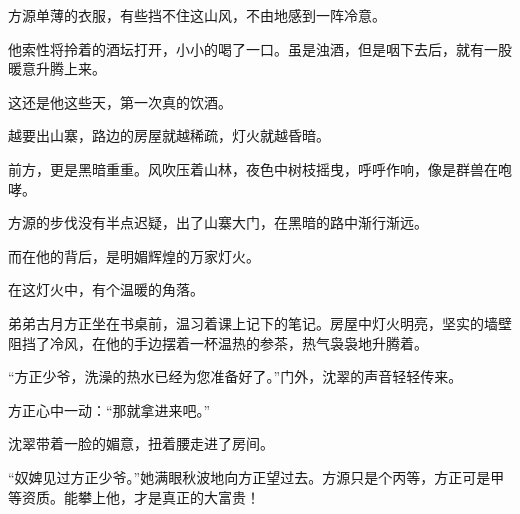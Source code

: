 \begin{this_body}
方源单薄的衣服，有些挡不住这山风，不由地感到一阵冷意。

他索性将拎着的酒坛打开，小小的喝了一口。虽是浊酒，但是咽下去后，就有一股暖意升腾上来。

这还是他这些天，第一次真的饮酒。

越要出山寨，路边的房屋就越稀疏，灯火就越昏暗。

前方，更是黑暗重重。风吹压着山林，夜色中树枝摇曳，呼呼作响，像是群兽在咆哮。

方源的步伐没有半点迟疑，出了山寨大门，在黑暗的路中渐行渐远。

而在他的背后，是明媚辉煌的万家灯火。

在这灯火中，有个温暖的角落。

弟弟古月方正坐在书桌前，温习着课上记下的笔记。房屋中灯火明亮，坚实的墙壁阻挡了冷风，在他的手边摆着一杯温热的参茶，热气袅袅地升腾着。

“方正少爷，洗澡的热水已经为您准备好了。”门外，沈翠的声音轻轻传来。

方正心中一动：“那就拿进来吧。”

沈翠带着一脸的媚意，扭着腰走进了房间。

“奴婢见过方正少爷。”她满眼秋波地向方正望过去。方源只是个丙等，方正可是甲等资质。能攀上他，才是真正的大富贵！

\end{this_body}

